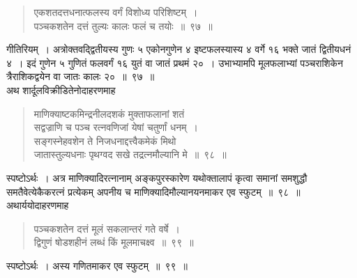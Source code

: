 \documentclass[11pt, openany]{book}
\begin{document}
 \label{97}
\begin{quote}
    \eg 
      एकशतदत्तधनात्फलस्य वर्गं विशोध्य परिशिष्टम्~। \\
 पञ्चकशतेन दत्तं तुल्यः कालः फलं च तयोः~॥~९७~॥~
\end{quote}

 गीतिरियम्~। अत्रोक्तवद्द्वितीयस्य गुणः ५ एकोनगुणेन ४ इष्टफलस्यास्य ४ 
वर्गे १६ भक्ते जातं द्वितीयधनं ४~। इदं गुणेन ५ गुणितं फलवर्गं १६ युतं वा
जातं प्रथमं २०~। उभाभ्यामपि मूलफलाभ्यां पञ्चराशिकेन त्रैराशिकद्वयेन वा जातः कालः २०~॥~९७~॥~\\

\vspace{-2mm}
 अथ शार्दूलविक्रीडितेनोदाहरणमाह\textendash
 \begin{quote}
     \eg 
     माणिक्याष्टकमिन्द्रनीलदशकं मुक्ताफलानां शतं \\
 सद्वज्राणि च पञ्च रत्नवणिजां येषां चतुर्णां धनम्~। \\
 सङ्गस्नेहवशेन ते निजधनाद्दत्त्वैकमेकं मिथो \\
 जातास्तुल्यधनाः पृथग्वद सखे तद्रत्नमौल्यानि मे~॥~९८~॥~
 \end{quote}

 स्पष्टोऽर्थः~। अत्र माणिक्यादिरत्नानाम् अङ्कपुरस्कारेण यथोक्तालापं
कृत्वा समानां समशुद्धौ समतैवेत्येकैकरत्नं प्रत्येकम् अपनीय च माणिक्यादिमौल्यानयनमाकर एव स्फुटम्~॥~९८~॥~\\

\vspace{-2mm}
 अथार्ययोदाहरणमाह\textendash
\begin{quote}
    \eg 
     पञ्चकशतेन दत्तं मूलं सकलान्तरं गते वर्षे~। \\
 द्विगुणं षोडशहीनं लब्धं किं मूलमाचक्ष्व~॥~९९~॥~
\end{quote}

 स्पष्टोऽर्थः~। अस्य गणितमाकर एव स्फुटम्~॥~९९~॥~\\
\end{document}
